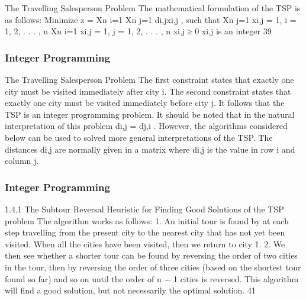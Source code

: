 \begin{frame}
The Travelling Salesperson Problem
The mathematical formulation of the TSP is as follows: Minimize
z =
Xn
i=1
Xn
j=1
di,jxi,j
,
such that
Xn
j=1
xi,j = 1, i = 1, 2, . . . , n
Xn
i=1
xi,j = 1, j = 1, 2, . . . , n
xi,j ≥ 0 xi,j
is an integer
39 \end{frame}  \begin{frame} \frametitle{Integer Programming}     
The Travelling Salesperson Problem
The first constraint states that exactly one city must be visited
immediately after city i.
The second constraint states that exactly one city must be visited
immediately before city j.
It follows that the TSP is an integer programming problem.
It should be noted that in the natural interpretation of this
problem di,j = dj,i
. However, the algorithms considered below can
be used to solved more general interpretations of the TSP.
The distances di,j are normally given in a matrix where di,j
is the
value in row i and column j.
\end{frame}  
\begin{frame}
 \frametitle{Integer Programming}     

1.4.1 The Subtour Reversal Heuristic for Finding Good
Solutions of the TSP problem
The algorithm works as follows:
1. An initial tour is found by at each step travelling
from the present city to the nearest city that has not
yet been visited. When all the cities have been
visited, then we return to city 1.
2. We then see whether a shorter tour can be found by
reversing the order of two cities in the tour, then by
reversing the order of three cities (based on the
shortest tour found so far) and so on until the order
of n − 1 cities is reversed.
This algorithm will find a good solution, but not necessarily the
optimal solution.
41 
\end{frame}  
